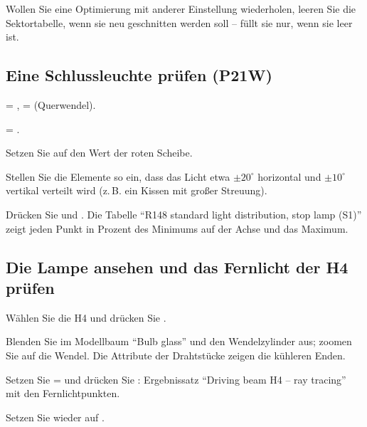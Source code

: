 \begin{tipp}
Wollen Sie eine Optimierung mit anderer Einstellung wiederholen, leeren Sie die Sektortabelle, wenn
sie neu geschnitten werden soll --  füllt sie nur, wenn sie leer ist.
\end{tipp}

\subsection{Eine Schlussleuchte prüfen (P21W)}

\begin{schritte}
  \item {} = ,  = 
    (Querwendel).
  \item {} = .
  \item Setzen Sie  auf den Wert der roten Scheibe.
  \item Stellen Sie die Elemente so ein, dass das Licht etwa $\pm 20^\circ$ horizontal und
    $\pm 10^\circ$ vertikal verteilt wird (z.\,B. ein Kissen mit großer Streuung).
  \item Drücken Sie  und . Die Tabelle \enquote{R148
    standard light distribution, stop lamp (S1)} zeigt jeden Punkt in Prozent des Minimums auf der
    Achse und das Maximum.
\end{schritte}

\subsection{Die Lampe ansehen und das Fernlicht der H4 prüfen}

\begin{schritte}
  \item Wählen Sie die H4 und drücken Sie .
  \item Blenden Sie im Modellbaum \enquote{Bulb glass} und den Wendelzylinder aus; zoomen Sie auf die
    Wendel. Die Attribute  der Drahtstücke zeigen die kühleren Enden.
  \item Setzen Sie  =  und drücken Sie : Ergebnissatz \enquote{Driving beam H4 – ray tracing} mit den Fernlichtpunkten.
  \item Setzen Sie  wieder auf .
\end{schritte}

